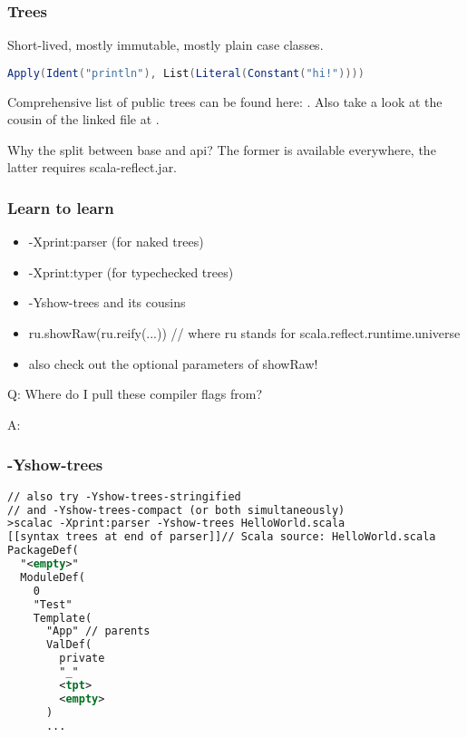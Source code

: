 \documentclass[hyperref={bookmarks=false}]{beamer}
\begin{document}
\begin{frame}[fragile]
\frametitle{Trees}

Short-lived, mostly immutable, mostly plain case classes.

\begin{lstlisting}[language=Scala]
Apply(Ident("println"), List(Literal(Constant("hi!"))))
\end{lstlisting}

Comprehensive list of public trees can be found here:
. Also take a look at the cousin of the linked file at .

Why the split between base and api? The former is available everywhere, the latter requires scala-reflect.jar.

\end{frame}

\begin{frame}[fragile]
\frametitle{Learn to learn}

\begin{itemize}
\item -Xprint:parser (for naked trees)
\item -Xprint:typer (for typechecked trees)
\item -Yshow-trees and its cousins
\item ru.showRaw(ru.reify(...)) // where ru stands for scala.reflect.runtime.universe
\item also check out the optional parameters of showRaw!
\end{itemize}

Q: Where do I pull these compiler flags from?

A: 

\end{frame}

\begin{frame}[fragile]
\frametitle{-Yshow-trees}

\begin{lstlisting}[language=XML]
// also try -Yshow-trees-stringified
// and -Yshow-trees-compact (or both simultaneously)
>scalac -Xprint:parser -Yshow-trees HelloWorld.scala
[[syntax trees at end of parser]]// Scala source: HelloWorld.scala
PackageDef(
  "<empty>"
  ModuleDef(
    0
    "Test"
    Template(
      "App" // parents
      ValDef(
        private
        "_"
        <tpt>
        <empty>
      )
      ...
\end{lstlisting}

\end{frame}
\end{document}
